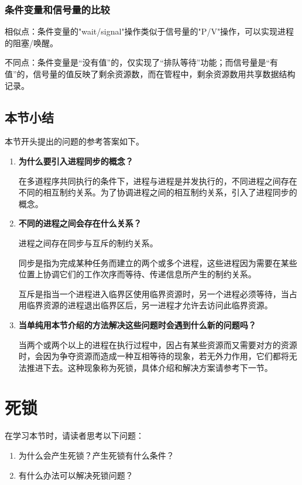 \documentclass{ctexbook}
\begin{document}
\subsubsection{条件变量和信号量的比较}
相似点：条件变量的"wait/signal"操作类似于信号量的"P/V"操作，可以实现进程的阻塞/唤醒。

不同点：条件变量是“没有值”的，仅实现了“排队等待”功能；而信号量是“有值”的，信号量的值反映了剩余资源数，而在管程中，剩余资源数用共享数据结构记录。

\subsection{本节小结}

本节开头提出的问题的参考答案如下。

\begin{enumerate}
	\item \textbf{为什么要引入进程同步的概念？}
	
	在多道程序共同执行的条件下，进程与进程是并发执行的，不同进程之间存在不同的相互制约关系。为了协调进程之间的相互制约关系，引入了进程同步的概念。
	
	\item \textbf{不同的进程之间会存在什么关系？}
	
	进程之间存在同步与互斥的制约关系。
	
	同步是指为完成某种任务而建立的两个或多个进程，这些进程因为需要在某些位置上协调它们的工作次序而等待、传递信息所产生的制约关系。
	
	互斥是指当一个进程进入临界区使用临界资源时，另一个进程必须等待，当占用临界资源的进程退出临界区后，另一进程才允许去访问此临界资源。
	
	\item \textbf{当单纯用本节介绍的方法解决这些问题时会遇到什么新的问题吗？}
	
	当两个或两个以上的进程在执行过程中，因占有某些资源而又需要对方的资源时，会因为争夺资源而造成一种互相等待的现象，若无外力作用，它们都将无法推进下去。这种现象称为死锁，具体介绍和解决方案请参考下一节。
\end{enumerate}

\section{死锁}

在学习本节时，请读者思考以下问题：
\begin{enumerate}
	\item 为什么会产生死锁？产生死锁有什么条件？
	\item 有什么办法可以解决死锁问题？
\end{enumerate}
\end{document}
